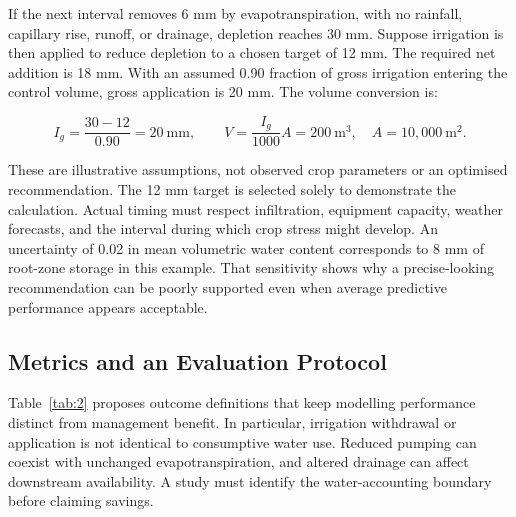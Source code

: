\documentclass[11pt,a4paper]{article}
\begin{document}
If the next interval removes 6 mm by evapotranspiration, with no rainfall, capillary rise, runoff, or drainage, depletion reaches 30 mm. Suppose irrigation is then applied to reduce depletion to a chosen target of 12 mm. The required net addition is 18 mm. With an assumed 0.90 fraction of gross irrigation entering the control volume, gross application is 20 mm. The volume conversion is:

\begin{equation}
I_g=\frac{30-12}{0.90}=20\ \mathrm{mm},\qquad V=\frac{I_g}{1000}A=200\ \mathrm{m^3},\quad A=10{,}000\ \mathrm{m^2}.
\label{eq:12}
\end{equation}

These are illustrative assumptions, not observed crop parameters or an optimised recommendation. The 12 mm target is selected solely to demonstrate the calculation. Actual timing must respect infiltration, equipment capacity, weather forecasts, and the interval during which crop stress might develop. An uncertainty of 0.02 in mean volumetric water content corresponds to 8 mm of root-zone storage in this example. That sensitivity shows why a precise-looking recommendation can be poorly supported even when average predictive performance appears acceptable.

\subsection{Metrics and an Evaluation Protocol}

\label{sec:8-3}

Table~\ref{tab:2} proposes outcome definitions that keep modelling performance distinct from management benefit. In particular, irrigation withdrawal or application is not identical to consumptive water use. Reduced pumping can coexist with unchanged evapotranspiration, and altered drainage can affect downstream availability. A study must identify the water-accounting boundary before claiming savings.
\end{document}

